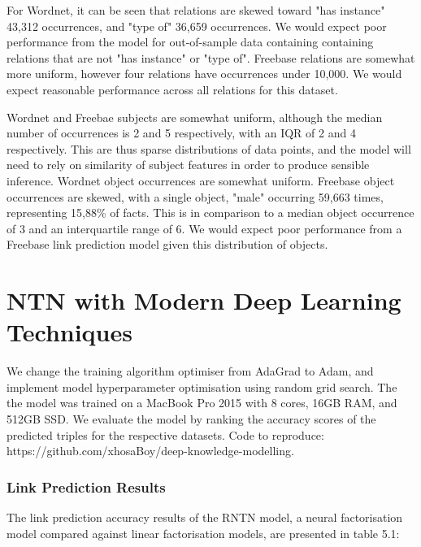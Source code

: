 For Wordnet, it can be seen that relations are skewed toward "has instance" 43,312 occurrences, and "type of" 36,659 occurrences. We would expect poor performance from the model for out-of-sample data containing
containing relations that are not "has instance" or "type of". Freebase relations are somewhat more uniform, however four relations have occurrences under 10,000. We would expect reasonable performance across all relations for this dataset. \newpage

Wordnet and Freebae subjects are somewhat uniform, although the median number of occurrences is 2 and 5 respectively, with an IQR of 2 and 4 respectively. This are thus sparse distributions of data points, and the model will need to rely on 
similarity of subject features in order to produce sensible inference. Wordnet object occurrences are somewhat uniform. Freebase object occurrences are skewed, with a single object, "male" occurring 59,663 times, representing 15,88\% of facts. This is in comparison to a median object occurrence of 3 and an interquartile range of 6.
We would expect poor performance from a Freebase link prediction model given this distribution of objects. 


\section{NTN with Modern Deep Learning Techniques}

We change the training algorithm optimiser from AdaGrad to Adam, and implement model hyperparameter optimisation using random grid search. The the model was trained on a MacBook Pro 2015 with 8 cores, 16GB RAM, and 512GB SSD. We evaluate the model by ranking the accuracy scores of the predicted triples for the respective datasets. Code to reproduce: https://github.com/xhosaBoy/deep-knowledge-modelling.

\subsubsection{Link Prediction Results}
The link prediction accuracy results of the RNTN model, a neural factorisation model compared against linear factorisation models, are presented in table 5.1:

